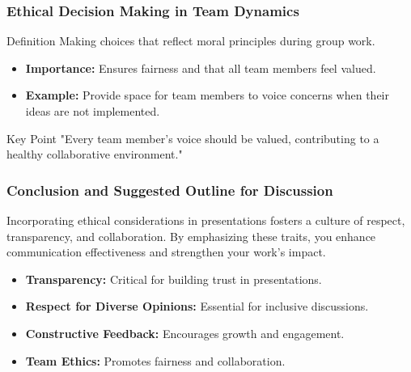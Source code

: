\documentclass[aspectratio=169]{beamer}
\begin{document}
\begin{frame}[fragile]
    \frametitle{Ethical Decision Making in Team Dynamics}
    \begin{block}{Definition}
        Making choices that reflect moral principles during group work.
    \end{block}
    
    \begin{itemize}
        \item \textbf{Importance:} Ensures fairness and that all team members feel valued.
        \item \textbf{Example:} Provide space for team members to voice concerns when their ideas are not implemented.
    \end{itemize}
    
    \begin{block}{Key Point}
        "Every team member's voice should be valued, contributing to a healthy collaborative environment."
    \end{block}
\end{frame}

\begin{frame}[fragile]
    \frametitle{Conclusion and Suggested Outline for Discussion}
    Incorporating ethical considerations in presentations fosters a culture of respect, transparency, and collaboration. 
    By emphasizing these traits, you enhance communication effectiveness and strengthen your work's impact.
    
    \begin{itemize}
        \item \textbf{Transparency:} Critical for building trust in presentations.
        \item \textbf{Respect for Diverse Opinions:} Essential for inclusive discussions.
        \item \textbf{Constructive Feedback:} Encourages growth and engagement.
        \item \textbf{Team Ethics:} Promotes fairness and collaboration.
    \end{itemize}
\end{frame}
\end{document}
